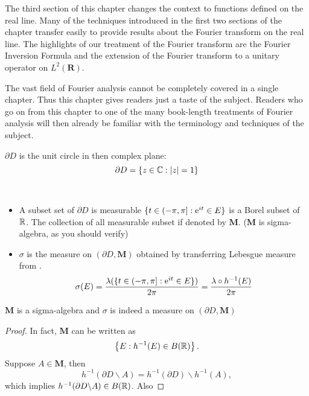 \documentclass[12pt]{book}
\begin{document}
The third section of this chapter changes the context to functions defined on the real line. Many of the techniques introduced in the first two sections of the chapter transfer easily to provide results about the Fourier transform on the real line. The highlights of our treatment of the Fourier transform are the Fourier Inversion Formula and the extension of the Fourier transform to a unitary operator on $L^2(\mathbf{R})$.

The vast field of Fourier analysis cannot be completely covered in a single chapter. Thus this chapter gives readers just a taste of the subject. Readers who go on from this chapter to one of the many book-length treatments of Fourier analysis will then already be familiar with the terminology and techniques of the subject.
\newpage
\begin{definition}
$\partial D$ is the unit circle in then complex plane:
$$
\partial D = \{z\in \mathbb{C}: |z|=1 \}
$$
\end{definition}

\begin{definition}\label{Curve Measure} \ 
\begin{itemize}
	\item A subset set of $\partial D$ is measurable $\{t\in(-\pi,\pi]: \mathrm{e}^{it}\in E \}$ is a Borel subset of $\mathbb{R}$. The collection of all measurable subset if denoted by $\mathbf M$. ($\mathbf M$ is sigma-algebra, as you should verify)
	\item $\sigma$ is the measure on $(\partial D,\mathbf M)$ obtained by transferring Lebesgue measure from .
	$$
	\sigma(E)=\frac{\lambda(\{ t\in(-\pi,\pi]: \mathrm{e}^{it}\in E\})}{2\pi}=\frac{\lambda \circ h^{-1}(E)}{2\pi}	$$
\end{itemize}
\end{definition}

\begin{theorem}
$\mathbf{M}$ is a sigma-algebra and $\sigma$ is indeed a measure on $(\partial D,\mathbf{M})$
\end{theorem}
\begin{proof}
In fact, $\mathbf{M}$ can be written as 
$$
\left\{E: h^{-1}(E)\in B(\mathbb{R}) \right\}.
$$	
Suppose $A \in \mathbf{M}$, then 
$$
h^{-1}(\partial D\backslash A) = h^{-1}(\partial D)\backslash h^{-1}(A),
$$
which implies $h^{-1}(\partial D\backslash A) \in B(\mathbb{R})$. Also
\end{proof}
\end{document}
